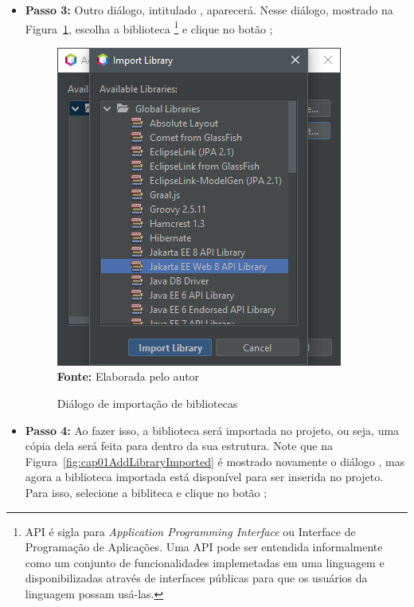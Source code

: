 \begin{itemize}
    \item \textbf{Passo 3:} Outro diálogo, intitulado , aparecerá. Nesse diálogo, mostrado na Figura~\ref{fig:cap01AddLibraryImport}, escolha a biblioteca \footnote{API é sigla para \textit{Application Programming Interface} ou Interface de Programação de Aplicações. Uma API pode ser entendida informalmente como um conjunto de funcionalidades implemetadas em uma linguagem e disponibilizadas através de interfaces públicas para que os usuários da linguagem possam usá-las.} e clique no botão ;
    
    \FloatBarrier
    \begin{figure}[!htbp]
        \centering
        \caption{Diálogo de importação de bibliotecas}
        \includegraphics[scale=0.9]{imagens/cap01AddLibraryImport}
        \\\textbf{Fonte:} Elaborada pelo autor
        \label{fig:cap01AddLibraryImport}
    \end{figure}
    \FloatBarrier
    
    \item \textbf{Passo 4:} Ao fazer isso, a biblioteca será importada no projeto, ou seja, uma cópia dela será feita para dentro da sua estrutura. Note que na Figura~\ref{fig:cap01AddLibraryImported} é mostrado novamente o diálogo , mas agora a biblioteca importada está disponível para ser inserida no projeto. Para isso, selecione a bibliteca e clique no botão ;
    

\end{itemize}
